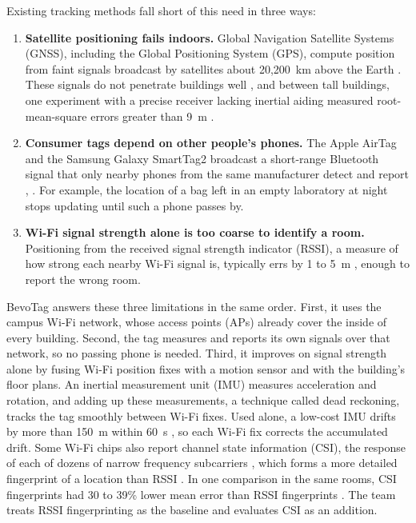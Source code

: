 \documentclass[12pt,letterpaper]{article}
\begin{document}
Existing tracking methods fall short of this need in three ways:
\begin{enumerate}
  \item \textbf{Satellite positioning fails indoors.} Global Navigation Satellite Systems (GNSS),
    including the Global Positioning System (GPS), compute position from faint signals broadcast by
    satellites about 20,200~km above the Earth \cite{gps}. These signals do not penetrate buildings
    well \cite{hechan}, and between tall buildings, one experiment with a precise receiver lacking
    inertial aiding measured root-mean-square errors greater than 9~m \cite{yoder}.
  \item \textbf{Consumer tags depend on other people's phones.} The Apple AirTag and the Samsung
    Galaxy SmartTag2 broadcast a short-range Bluetooth signal that only nearby phones from the same
    manufacturer detect and report \cite{airtag}, \cite{smarttag}. For example, the location of a bag
    left in an empty laboratory at night stops updating until such a phone passes by.
  \item \textbf{Wi-Fi signal strength alone is too coarse to identify a room.} Positioning from the
    received signal strength indicator (RSSI), a measure of how strong each nearby Wi-Fi signal is,
    typically errs by 1 to 5~m \cite{rssi}, enough to report the wrong room.
\end{enumerate}

BevoTag answers these three limitations in the same order. First, it uses the campus Wi-Fi network,
whose access points (APs) already cover the inside of every building. Second, the tag measures and
reports its own signals over that network, so no passing phone is needed. Third, it improves on
signal strength alone by fusing Wi-Fi position fixes with a motion sensor and with the building's
floor plans. An inertial measurement unit (IMU) measures acceleration and rotation, and adding up
these measurements, a technique called dead reckoning, tracks the tag smoothly between Wi-Fi fixes.
Used alone, a low-cost IMU drifts by more than 150~m within 60~s \cite{imu}, so each Wi-Fi fix
corrects the accumulated drift. Some Wi-Fi chips also report channel state information (CSI), the
response of each of dozens of narrow frequency subcarriers \cite{espcsi}, which forms a more detailed
fingerprint of a location than RSSI \cite{yangcsi}. In one comparison in the same rooms, CSI
fingerprints had 30 to 39\% lower mean error than RSSI fingerprints \cite{deepfi}. The team treats RSSI fingerprinting as the
baseline and evaluates CSI as an addition.
\end{document}
